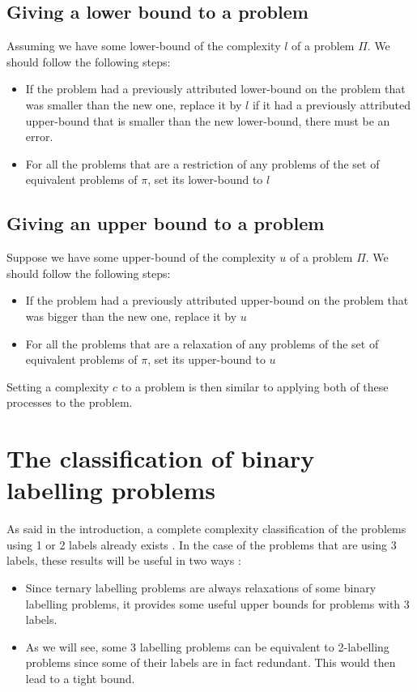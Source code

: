 \subsection{Giving a lower bound to a problem}
Assuming we have some lower-bound of the complexity $l$ of a problem $\Pi$. We should follow the following steps:
\begin{itemize}
    \item If the problem had a previously attributed lower-bound on the problem that was smaller than the new one, replace it by $l$ if it had a previously attributed upper-bound that is smaller than the new lower-bound, there must be an error.
    \item For all the problems that are a restriction of any problems of the set of equivalent problems of $\pi$, set its lower-bound to $l$
\end{itemize}
\subsection{Giving an upper bound to a problem}
Suppose we have some upper-bound of the complexity $u$ of a problem $\Pi$. We should follow the following steps:
\begin{itemize}
    \item If the problem had a previously attributed upper-bound on the problem that was bigger than the new one, replace it by $u$
    \item For all the problems that are a relaxation of any problems of the set of equivalent problems of $\pi$, set its upper-bound to $u$
\end{itemize}
Setting a complexity $c$ to a problem is then similar to applying both of these processes to the problem.


\section{The classification of binary labelling problems}\label{sec:BLP}
As said in the introduction, a complete complexity classification of the problems using 1 or 2 labels already exists \cite{1}. In the case of the problems that are using 3 labels, these results will be useful in two ways :
\begin{itemize}
    \item Since ternary labelling problems are always relaxations of some binary labelling problems, it provides some useful upper bounds for problems with 3 labels.
    \item As we will see, some 3 labelling problems can be equivalent to 2-labelling problems since some of their labels are in fact redundant. This would then lead to a tight bound.
\end{itemize}
